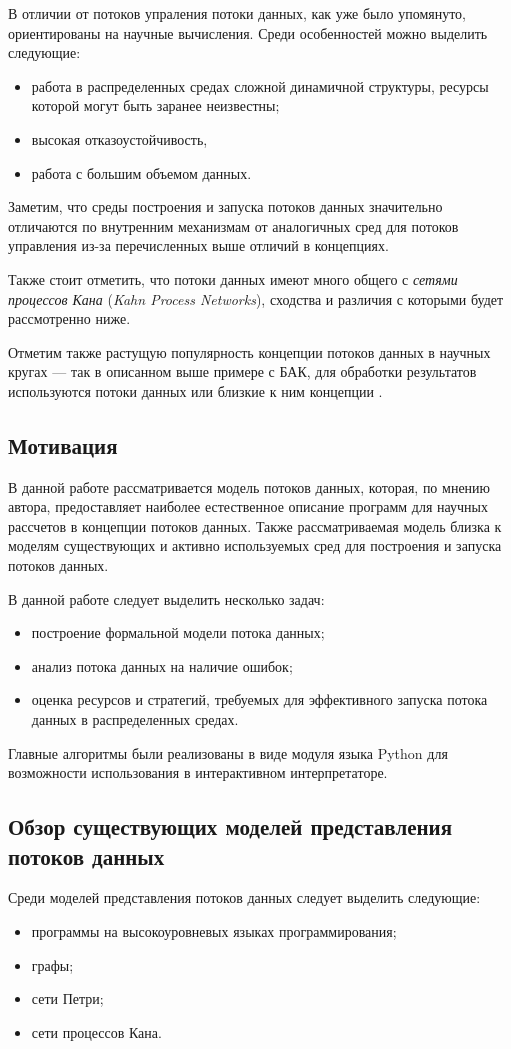 \documentclass[10pt,a4paper]{article}
\begin{document}
В отличии от потоков упраления потоки данных, как уже было упомянуто, ориентированы на научные вычисления.
Среди особенностей можно выделить следующие:
\begin{itemize}
  \item работа в распределенных средах сложной динамичной структуры, ресурсы которой могут быть заранее неизвестны;
  \item высокая отказоустойчивость,
  \item работа с большим объемом данных.
\end{itemize}
Заметим, что среды построения и запуска потоков данных значительно отличаются по внутренним механизмам от
аналогичных сред для потоков управления из-за перечисленных выше отличий в концепциях.

Также стоит отметить, что потоки данных имеют
много общего с \textit{сетями процессов Кана} (\textit{Kahn Process Networks}), сходства и различия с которыми будет рассмотренно ниже.

Отметим также растущую популярность концепции потоков данных в научных кругах --- так в описанном выше примере с БАК,
для обработки результатов используются потоки данных или близкие к ним концепции \cite{lhc-manual}.

\subsection{Мотивация}
В данной работе рассматривается модель потоков данных, которая, по мнению автора, предоставляет наиболее
естественное описание программ для научных рассчетов в концепции потоков данных.
Также рассматриваемая модель близка к моделям существующих и активно используемых сред для построения и запуска потоков данных.

В данной работе следует выделить несколько задач:
\begin{itemize}
  \item построение формальной модели потока данных;
  \item анализ потока данных на наличие ошибок;
  \item оценка ресурсов и стратегий, требуемых для эффективного запуска потока данных в распределенных средах.
\end{itemize}

Главные алгоритмы были реализованы в виде модуля языка Python для возможности
использования в интерактивном интерпретаторе.

\subsection{Обзор существующих моделей представления потоков данных}
Среди моделей представления потоков данных следует выделить следующие:
\begin{itemize}
  \item программы на высокоуровневых языках программирования;
  \item графы;
  \item сети Петри;
  \item сети процессов Кана.
\end{itemize}
\end{document}
